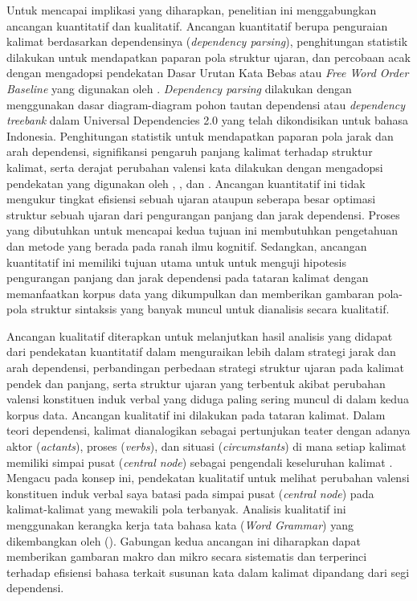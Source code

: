 Untuk mencapai implikasi yang diharapkan, penelitian ini menggabungkan ancangan kuantitatif dan kualitatif. Ancangan kuantitatif berupa penguraian kalimat berdasarkan dependensinya (\textit{dependency parsing}), penghitungan statistik dilakukan untuk mendapatkan paparan pola struktur ujaran, dan percobaan acak dengan mengadopsi pendekatan Dasar Urutan Kata Bebas atau \textit{Free Word Order Baseline} yang digunakan oleh \cite{futrell2015large}. \textit{Dependency parsing} dilakukan dengan menggunakan dasar diagram-diagram pohon tautan dependensi atau \textit{dependency treebank} dalam Universal Dependencies 2.0 \citep{nivre2017universal} yang telah dikondisikan untuk bahasa Indonesia. Penghitungan statistik untuk mendapatkan paparan pola jarak dan arah dependensi, signifikansi pengaruh panjang kalimat terhadap struktur kalimat, serta derajat perubahan valensi kata dilakukan dengan mengadopsi pendekatan yang digunakan oleh \cite{gildea2010grammars}, \cite{futrell2015large}, \cite{jiang2015effects} dan \cite{liu2017dependency}. Ancangan kuantitatif ini tidak mengukur tingkat efisiensi sebuah ujaran ataupun seberapa besar optimasi struktur sebuah ujaran dari pengurangan panjang dan jarak dependensi. Proses yang dibutuhkan untuk mencapai kedua tujuan ini membutuhkan pengetahuan dan metode yang berada pada ranah ilmu kognitif. Sedangkan, ancangan kuantitatif ini memiliki tujuan utama untuk untuk menguji hipotesis pengurangan panjang dan jarak dependensi pada tataran kalimat dengan memanfaatkan korpus data yang dikumpulkan dan memberikan gambaran pola-pola struktur sintaksis yang banyak muncul untuk dianalisis secara kualitatif.

Ancangan kualitatif diterapkan untuk melanjutkan hasil analisis yang didapat dari pendekatan kuantitatif dalam menguraikan lebih dalam strategi jarak dan arah dependensi, perbandingan perbedaan strategi struktur ujaran pada kalimat pendek dan panjang, serta struktur ujaran yang terbentuk akibat perubahan valensi konstituen induk verbal yang diduga paling sering muncul di dalam kedua korpus data. Ancangan kualitatif ini dilakukan pada tataran kalimat. Dalam teori dependensi, kalimat dianalogikan sebagai pertunjukan teater dengan adanya aktor (\textit{actants}), proses (\textit{verbs}), dan situasi (\textit{circumstants}) di mana setiap kalimat memiliki simpai pusat (\textit{central node}) sebagai pengendali keseluruhan kalimat \citep{tesniere1959elements}. Mengacu pada konsep ini, pendekatan kualitatif untuk melihat perubahan valensi konstituen induk verbal saya batasi pada simpai pusat (\textit{central node}) pada kalimat-kalimat yang mewakili pola terbanyak. Analisis kualitatif ini menggunakan kerangka kerja tata bahasa kata (\textit{Word Grammar}) yang dikembangkan oleh (\citealp{hudson1984word,hudson2007language}). Gabungan kedua ancangan ini diharapkan dapat memberikan gambaran makro dan mikro secara sistematis dan terperinci terhadap efisiensi bahasa terkait susunan kata dalam kalimat dipandang dari segi dependensi. 

